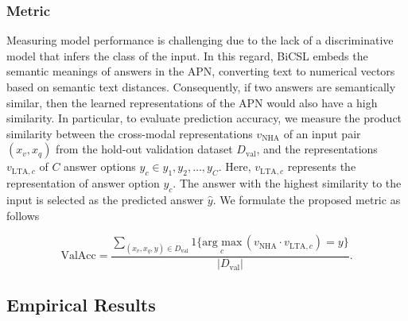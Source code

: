 \documentclass[letterpaper]{article} %
\begin{document}
\subsubsection{Metric}
Measuring model performance is challenging due to the lack of a discriminative model that infers the class of the input. In this regard, BiCSL embeds the semantic meanings of answers in the APN, converting text to numerical vectors based on semantic text distances. Consequently, if two answers are semantically similar, then the learned representations of the APN would also have a high similarity. In particular, to evaluate prediction accuracy, we measure the product similarity between the cross-modal representations $v_{\text{NHA}}$ of an input pair $(x_v, x_q)$ from the hold-out validation dataset $D_{\text{val}}$, and the representations $v_{\text{LTA},c}$ of $C$ answer options $y_c \in {y_1, y_2, \dots, y_C}$. Here, $v_{\text{LTA},c}$ represents the representation of answer option $y_c$. The answer with the highest similarity to the input is selected as the predicted answer $\hat{y}$. We formulate the proposed metric as follows

\begin{equation}
    \mbox{ValAcc} = \frac{\sum_{ (x_v,x_q,y)\in D_{\text{val}}}   {1}\{ \underset{c}{\mbox{arg max}}\,(v_{\text{NHA}}\cdot v_{\text{LTA},c})  = y   \}    }{  |D_{\text{val}}| }.
    \label{eq:acc}
\end{equation}


\subsection{Empirical Results}
\end{document}
